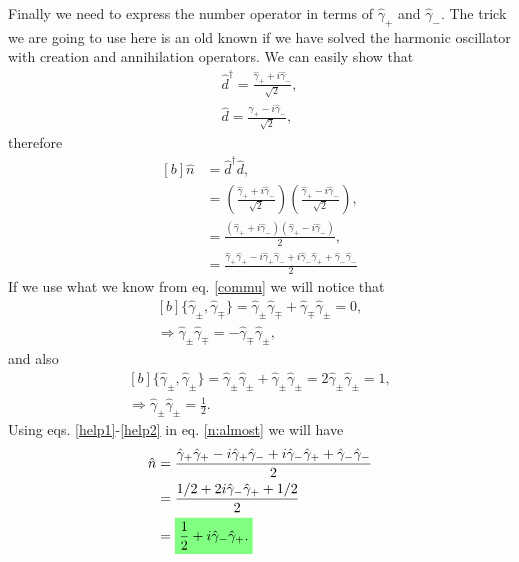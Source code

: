 \begin{questions}
\begin{solution}
  Finally we need to express the number operator in terms of $\hat{\gamma}_+$ and $\hat{\gamma}_-$. The trick we are going to use here is an old known if we have solved the harmonic oscillator with creation and annihilation operators. We can easily show that
  \begin{eqnarray}
    \hat{d}^\dagger = \frac{\hat{\gamma}_+ + i\hat{\gamma}_-}{\sqrt{2}},\\
    \hat{d} = \frac{\hat{\gamma}_+ - i\hat{\gamma}_-}{\sqrt{2}},
  \end{eqnarray}
  therefore
  \begin{equation}
    \begin{aligned}[b]
      \hat{n} &= \hat{d}^\dagger \hat{d},\\
      &= \left(\frac{\hat{\gamma}_+ + i\hat{\gamma}_-}{\sqrt{2}}\right)\left(\frac{\hat{\gamma}_+ - i\hat{\gamma}_-}{\sqrt{2}}\right),\\
      &= \frac{(\hat{\gamma}_+ + i\hat{\gamma}_-)(\hat{\gamma}_+ - i\hat{\gamma}_-)}{2},\\
      &= \frac{\hat{\gamma}_+\hat{\gamma}_+ - i\hat{\gamma}_+\hat{\gamma}_- + i\hat{\gamma}_- \hat{\gamma}_+ + \hat{\gamma}_-\hat{\gamma}_-}{2}
      \label{n:almost}
    \end{aligned}
  \end{equation}
  If we use what we know from eq. \ref{commu} we will notice that
  \begin{equation}
    \begin{aligned}[b]
      \{\hat{\gamma}_\pm,\hat{\gamma}_\mp \} = \hat{\gamma}_\pm\hat{\gamma}_\mp+ \hat{\gamma}_\mp\hat{\gamma}_\pm = 0,\\
      \Rightarrow \hat{\gamma}_\pm\hat{\gamma}_\mp = - \hat{\gamma}_\mp\hat{\gamma}_\pm,
      \label{help1}
    \end{aligned}
  \end{equation}
  and also
  \begin{equation}
    \begin{aligned}[b]
      \{\hat{\gamma}_\pm,\hat{\gamma}_\pm \} = \hat{\gamma}_\pm\hat{\gamma}_\pm+ \hat{\gamma}_\pm\hat{\gamma}_\pm = 2 \hat{\gamma}_\pm\hat{\gamma}_\pm = 1,\\
      \Rightarrow \hat{\gamma}_\pm\hat{\gamma}_\pm = \frac{1}{2}.
      \label{help2}
    \end{aligned}
  \end{equation}
  Using eqs. \ref{help1}-\ref{help2} in eq. \ref{n:almost} we will have
  \begin{equation}
    \begin{aligned}[b]
      \hat{n} &= \frac{\hat{\gamma}_+\hat{\gamma}_+ - i\hat{\gamma}_+\hat{\gamma}_- + i\hat{\gamma}_- \hat{\gamma}_+ + \hat{\gamma}_-\hat{\gamma}_-}{2}\\
      &=\frac{1/2 + 2i\hat{\gamma}_- \hat{\gamma}_+ + 1/2}{2}\\
      &=\hlgreen{\frac{1}{2} + i\hat{\gamma}_- \hat{\gamma}_+.}
      \label{n:almost}
    \end{aligned}
  \end{equation}
\end{solution}
\end{questions}


%
%
